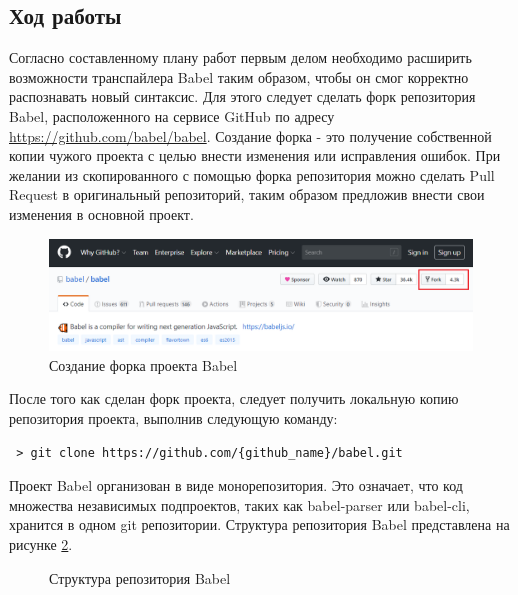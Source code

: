 \documentclass[14pt, a4paper]{article}
\begin{document}
\subsection{Ход работы}
Согласно составленному плану работ первым делом необходимо расширить возможности транспайлера Babel таким образом,
чтобы он смог корректно распознавать новый синтаксис. Для этого следует сделать форк репозитория Babel,
расположенного на сервисе GitHub по адресу \url{https://github.com/babel/babel}. Создание форка - это
получение собственной копии чужого проекта с целью внести изменения или исправления ошибок. При желании
из скопированного с помощью форка репозитория можно сделать Pull Request в оригинальный репозиторий,
таким образом предложив внести свои изменения в основной проект.
\begin{figure}[h!]
  \centering
  \includegraphics[scale=0.55]{img/babel_fork.PNG}
  \caption{Создание форка проекта Babel}
  \label{babel_fork}
\end{figure}

После того как сделан форк проекта, следует получить локальную копию репозитория проекта, выполнив следующую команду:
\begin{lstlisting}
 > git clone https://github.com/{github_name}/babel.git
\end{lstlisting}

Проект Babel организован в виде монорепозитория. Это означает, что код множества независимых подпроектов,
таких как babel-parser или babel-cli, хранится в одном git репозитории. Структура репозитория Babel
представлена на рисунке \ref{babel_dirs}.

\begin{figure}
\centering
{}
\caption{Структура репозитория Babel}
\label{babel_dirs}
\end{figure}
\end{document}
